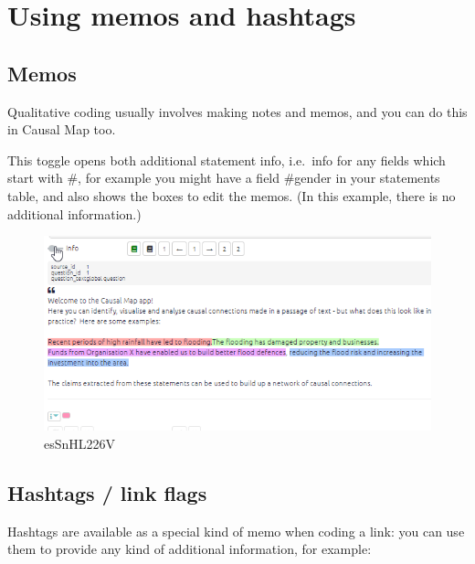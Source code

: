 \documentclass[
]{book}
\begin{document}
\hypertarget{xmemosandhashtags}{%
\section{Using memos and hashtags}\label{xmemosandhashtags}}

\hypertarget{xlink-memos}{%
\subsection{Memos}\label{xlink-memos}}

Qualitative coding usually involves making notes and memos, and you can do this in Causal Map too.

This toggle opens both additional statement info, i.e.~info for any fields which start with \#, for example you might have a field \#gender in your statements table, and also shows the boxes to edit the memos. (In this example, there is no additional information.)

\begin{figure}
\centering
\includegraphics{_assets/esSnHL226V.gif}
\caption{esSnHL226V}
\end{figure}

\hypertarget{xhashtags}{%
\subsection{Hashtags / link flags}\label{xhashtags}}

Hashtags are available as a special kind of memo when coding a link: you can use them to provide any kind of additional information, for example:
\end{document}
